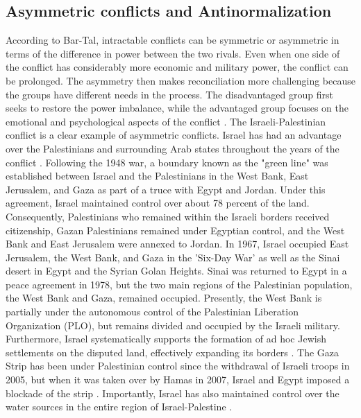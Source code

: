 \documentclass[dissertation,math,vertlayout,pdfa,colorlinks,nologo]{aaltoseries}
\begin{document}
\subsection{Asymmetric conflicts and Antinormalization}
According to Bar-Tal, intractable conflicts can be symmetric or asymmetric in terms of the difference in power between the two rivals. Even when one side of the conflict has considerably more economic and military power, the conflict can be prolonged. The asymmetry then makes reconciliation more challenging because the groups have different needs in the process. The disadvantaged group first seeks to restore the power imbalance, while the advantaged group focuses on the emotional and psychological aspects of the conflict \cite[p. 384]{bar-talIntractableConflictsSociopsychological2013}. The Israeli-Palestinian conflict is a clear example of asymmetric conflicts. Israel has had an advantage over the Palestinians and surrounding Arab states throughout the years of the conflict \cite{westfallIsraeliPalestinianConflictChronology2023}. Following the 1948 war, a boundary known as the "green line" was established between Israel and the Palestinians in the West Bank, East Jerusalem, and Gaza as part of a truce with Egypt and Jordan. Under this agreement, Israel maintained control over about 78 percent of the land. Consequently, Palestinians who remained within the Israeli borders received citizenship, Gazan Palestinians remained under Egyptian control, and the West Bank and East Jerusalem were annexed to Jordan. In 1967, Israel occupied East Jerusalem, the West Bank, and Gaza in the 'Six-Day War' as well as the Sinai desert in Egypt and the Syrian Golan Heights. Sinai was returned to Egypt in a peace agreement in 1978, but the two main regions of the Palestinian population, the West Bank and Gaza, remained occupied. Presently, the West Bank is partially under the autonomous control of the Palestinian Liberation Organization (PLO), but remains divided and occupied by the Israeli military. Furthermore, Israel systematically supports the formation of ad hoc Jewish settlements on the disputed land, effectively expanding its borders \cite{handelGatedGatingCommunity2014}. The Gaza Strip has been under Palestinian control since the withdrawal of Israeli troops in 2005, but when it was taken over by Hamas in 2007, Israel and Egypt imposed a blockade of the strip \cite{adnanEconomicIntegrationElimination2022}. Importantly, Israel has also maintained control over the water sources in the entire region of Israel-Palestine \cite{frohlichSecurityDiscourseIsraeli2012}.
\end{document}
